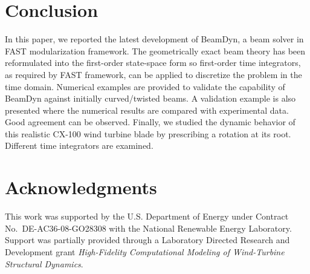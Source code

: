 \documentclass{aiaa-tc}
\begin{document}
 \section{Conclusion}
  In this paper, we reported the latest development of BeamDyn, a beam solver in FAST modularization framework. The geometrically exact beam theory has been reformulated into the first-order state-space form so first-order time integrators, as required by FAST framework, can be applied to discretize the problem in the time domain. Numerical examples are provided to validate the capability of BeamDyn against initially curved/twisted beams. A validation example is also presented where the numerical results are compared with experimental data. Good agreement can be observed. Finally, we studied the dynamic behavior of this realistic CX-100 wind turbine blade by prescribing a rotation at its root. Different time integrators are examined.
  
\section*{Acknowledgments} 

This work was supported by the U.S. Department of Energy under Contract No.\
DE-AC36-08-GO28308 with the National Renewable Energy Laboratory. Support
was partially provided through a Laboratory Directed Research and Development grant
\textit{High-Fidelity Computational Modeling of Wind-Turbine Structural
Dynamics}.
  
  



\end{document}
